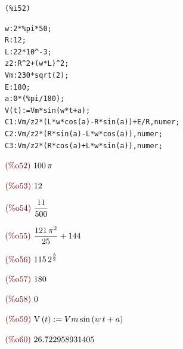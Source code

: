 \documentclass{article}
\begin{document}
\noindent
\begin{minipage}[t]{8ex}{\color{red}\bf
\begin{verbatim}
(%i52) 
\end{verbatim}}
\end{minipage}
\begin{minipage}[t]{\textwidth}{\color{blue}
\begin{verbatim}
w:2*%pi*50;
R:12;
L:22*10^-3;
z2:R^2+(w*L)^2;
Vm:230*sqrt(2);
E:180;
a:0*(%pi/180);
V(t):=Vm*sin(w*t+a);
C1:Vm/z2*(L*w*cos(a)-R*sin(a))+E/R,numer;
C2:Vm/z2*(R*sin(a)-L*w*cos(a)),numer;
C3:Vm/z2*(R*cos(a)+L*w*sin(a)),numer;
\end{verbatim}}
\end{minipage}
\begin{math}\displaystyle
\parbox{8ex}{\color{labelcolor}(\%o52) }
100\,\pi 
\end{math}

\begin{math}\displaystyle
\parbox{8ex}{\color{labelcolor}(\%o53) }
12
\end{math}

\begin{math}\displaystyle
\parbox{8ex}{\color{labelcolor}(\%o54) }
\frac{11}{500}
\end{math}

\begin{math}\displaystyle
\parbox{8ex}{\color{labelcolor}(\%o55) }
\frac{121\,{\pi }^{2}}{25}+144
\end{math}

\begin{math}\displaystyle
\parbox{8ex}{\color{labelcolor}(\%o56) }
115\,{2}^{\frac{3}{2}}
\end{math}

\begin{math}\displaystyle
\parbox{8ex}{\color{labelcolor}(\%o57) }
180
\end{math}

\begin{math}\displaystyle
\parbox{8ex}{\color{labelcolor}(\%o58) }
0
\end{math}

\begin{math}\displaystyle
\parbox{8ex}{\color{labelcolor}(\%o59) }
\mathrm{V}\left( t\right) :=Vm\,\mathrm{sin}\left( w\,t+a\right) 
\end{math}

\begin{math}\displaystyle
\parbox{8ex}{\color{labelcolor}(\%o60) }
26.722958931405
\end{math}
\end{document}
